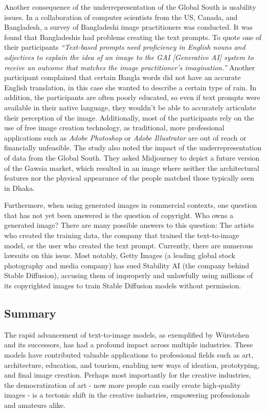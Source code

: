 \documentclass[11pt]{article}
\begin{document}
Another consequence of the underrepresentation of the Global South is usability issues. In a collaboration of computer scientists from the US, Canada, and Bangladesh\cite{mim2024impactoftexttoimagetoolsinglobalsouth}, a survey of Bangladeshi image practitioners was conducted. It was found that Bangladeshis had problems creating the text prompts. To quote one of their participants \textit{``Text-based prompts need proficiency in English nouns and adjectives to explain the idea of an image to the GAI [Generative AI] system to receive an outcome that matches the image practitioner's imagination.''} Another participant complained that certain Bangla words did not have an accurate English translation, in this case she wanted to describe a certain type of rain. In addition, the participants are often poorly educated, so even if text prompts were available in their native language, they wouldn't be able to accurately articulate their perception of the image. Additionally, most of the participants rely on the use of free image creation technology, as traditional, more professional applications such as \textit{Adobe Photoshop} or \textit{Adobe Illustrator} are out of reach or financially unfeasible. The study also noted the impact of the underrepresentation of data from the Global South. They asked Midjourney to depict a future version of the Gawsia market, which resulted in an image where neither the architectural features nor the physical appearance of the people matched those typically seen in Dhaka.

Furthermore, when using generated images in commercial contexts, one question that has not yet been answered is the question of copyright. Who owns a generated image? There are many possible answers to this question: The artists who created the training data, the company that trained the text-to-image model, or the user who created the text prompt. Currently, there are numerous lawsuits on this issue. Most notably, Getty Images (a leading global stock photography and media company) has sued Stability AI (the company behind Stable Diffusion), accusing them of improperly and unlawfully using millions of its copyrighted images to train Stable Diffusion models without permission\cite{cnn2023gettyimagesvsstabilityai}.

\subsection{Summary}

The rapid advancement of text-to-image models, as exemplified by Würstchen and its successors, has had a profound impact across multiple industries. These models have contributed valuable applications to professional fields such as art, architecture, education, and tourism, enabling new ways of ideation, prototyping, and final image creation. Perhaps most importantly for the creative industries, the democratization of art - now more people can easily create high-quality images - is a tectonic shift in the creative industries, empowering professionals and amateurs alike.
\end{document}
